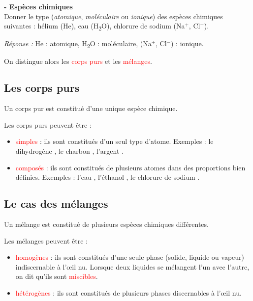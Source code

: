 \begin{mdframed}[style=autreexo]
\textbf{ - Espèces chimiques}\\
Donner le type (\textit{atomique}, \textit{moléculaire} ou \textit{ionique}) des espèces chimiques suivantes : hélium (He), eau (H\textsubscript{2}O), chlorure de sodium (Na$^{+}$, Cl$^{-}$).
\end{mdframed}
\textit{Réponse :} He : atomique, H\textsubscript{2}O : moléculaire, (Na$^{+}$, Cl$^{-}$) : ionique.

On distingue alors les \textcolor{red}{corps purs} et les \textcolor{red}{mélanges}.

\subsection{Les corps purs}
\begin{tcolorbox}[colback=green!5!white,colframe=green!75!black,title=\textbf{Corps purs}]
Un corps pur est constitué d'une unique espèce chimique.
\end{tcolorbox}

Les corps purs peuvent être :

\begin{itemize}
    \item \textcolor{red}{simples} : ils sont constitués d'un seul type d'atome. Exemples : le dihydrogène , le charbon , l'argent .
    \item \textcolor{red}{composés} : ils sont constitués de plusieurs atomes dans des proportions bien définies. Exemples : l'eau , l'éthanol , le chlorure de sodium .
\end{itemize}




%
\subsection{Le cas des mélanges}
\begin{tcolorbox}[colback=green!5!white,colframe=green!75!black,title=\textbf{Mélange}]
Un mélange est constitué de plusieurs espèces chimiques différentes.
\end{tcolorbox}
Les mélanges peuvent être :
\begin{itemize}
    \item \textcolor{red}{homogènes} : ils sont constitués d'une seule phase (solide, liquide ou vapeur) indiscernable à l'\oe il nu. Lorsque deux liquides se mélangent l'un avec l'autre, on dit qu'ils sont \textcolor{red}{miscibles}.
    \item \textcolor{red}{hétérogènes} : ils sont constitués de plusieurs phases discernables à l'\oe il nu.
\end{itemize}

